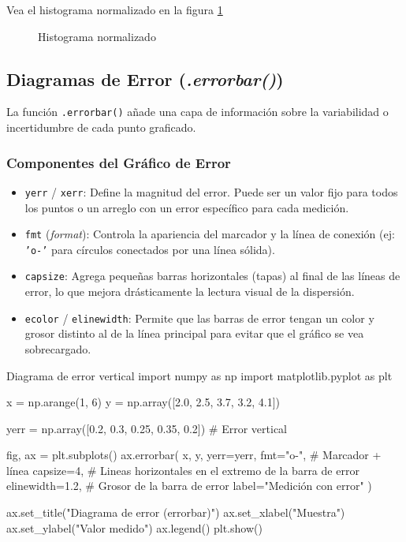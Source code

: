 Vea el histograma normalizado en la figura \ref{fig:grafico_avanzado_hist}

\begin{figure}[ht]
    \centering
     
    \caption{Histograma normalizado}
    \label{fig:grafico_avanzado_hist}
\end{figure}


\subsection{Diagramas de Error (\textit{.errorbar()})}

La función \texttt{.errorbar()} añade una capa de información sobre la variabilidad o incertidumbre de cada punto graficado.

\subsubsection{Componentes del Gráfico de Error}

\begin{itemize}
\item \texttt{yerr} / \texttt{xerr}: Define la magnitud del error. Puede ser un valor fijo para todos los puntos o un arreglo con un error específico para cada medición.
\item \texttt{fmt} (\textit{format}): Controla la apariencia del marcador y la línea de conexión (ej: \texttt{'o-'} para círculos conectados por una línea sólida).
\item \texttt{capsize}: Agrega pequeñas barras horizontales (tapas) al final de las líneas de error, lo que mejora drásticamente la lectura visual de la dispersión.
\item \texttt{ecolor} / \texttt{elinewidth}: Permite que las barras de error tengan un color y grosor distinto al de la línea principal para evitar que el gráfico se vea sobrecargado.
\end{itemize}

\begin{pycode}{Diagrama de error vertical}
import numpy as np
import matplotlib.pyplot as plt

x = np.arange(1, 6)
y = np.array([2.0, 2.5, 3.7, 3.2, 4.1])

yerr = np.array([0.2, 0.3, 0.25, 0.35, 0.2]) # Error vertical

fig, ax = plt.subplots()
ax.errorbar(
    x,
    y,
    yerr=yerr,
    fmt="o-", # Marcador + línea
    capsize=4, # Lineas horizontales en el extremo de la barra de error
    elinewidth=1.2, # Grosor de la barra de error
    label="Medición con error"
)

ax.set_title("Diagrama de error (errorbar)")
ax.set_xlabel("Muestra")
ax.set_ylabel("Valor medido")
ax.legend()
plt.show()    
\end{pycode}

